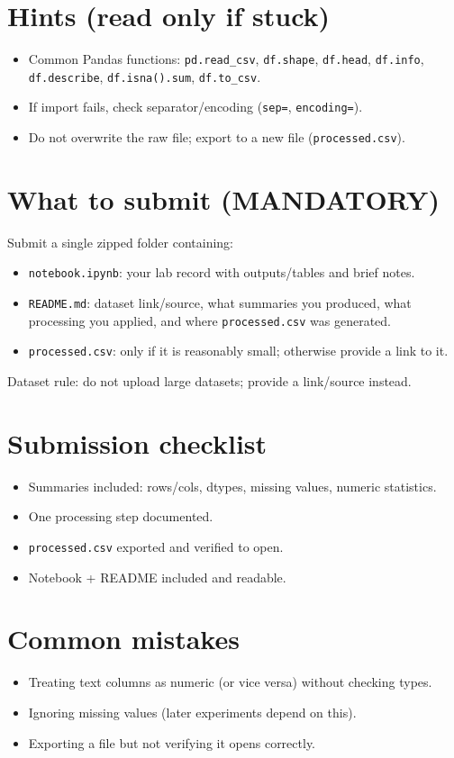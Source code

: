 \documentclass[11pt]{article}
\begin{document}
\section{Hints (read only if stuck)}
\begin{itemize}[leftmargin=*]
  \item Common Pandas functions: \texttt{pd.read\_csv}, \texttt{df.shape}, \texttt{df.head}, \texttt{df.info}, \texttt{df.describe}, \texttt{df.isna().sum}, \texttt{df.to\_csv}.
  \item If import fails, check separator/encoding (\texttt{sep=}, \texttt{encoding=}).
  \item Do not overwrite the raw file; export to a new file (\texttt{processed.csv}).
\end{itemize}

\section{What to submit (MANDATORY)}
Submit a single zipped folder containing:
\begin{itemize}[leftmargin=*]
  \item \texttt{notebook.ipynb}: your lab record with outputs/tables and brief notes.
  \item \texttt{README.md}: dataset link/source, what summaries you produced, what processing you applied, and where \texttt{processed.csv} was generated.
  \item \texttt{processed.csv}: only if it is reasonably small; otherwise provide a link to it.
\end{itemize}
Dataset rule: do not upload large datasets; provide a link/source instead.

\section{Submission checklist}
\begin{itemize}[leftmargin=*]
  \item Summaries included: rows/cols, dtypes, missing values, numeric statistics.
  \item One processing step documented.
  \item \texttt{processed.csv} exported and verified to open.
  \item Notebook + README included and readable.
\end{itemize}

\section{Common mistakes}
\begin{itemize}[leftmargin=*]
  \item Treating text columns as numeric (or vice versa) without checking types.
  \item Ignoring missing values (later experiments depend on this).
  \item Exporting a file but not verifying it opens correctly.
\end{itemize}

\notesources{\AIMLLabSources}
\end{document}
